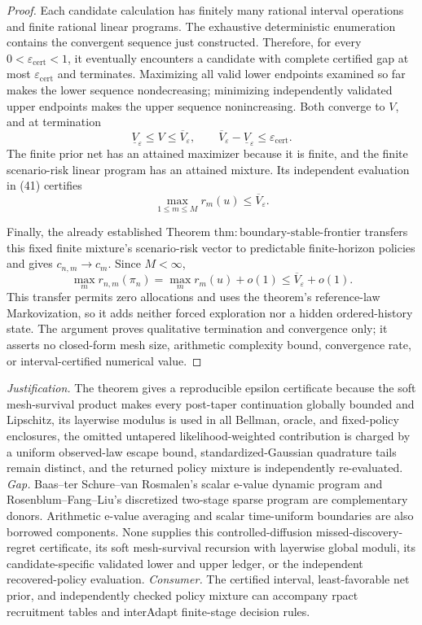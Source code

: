 \documentclass{article}
\begin{document}
\begin{proof}
Each candidate calculation has finitely many rational interval operations and finite rational linear programs.  The exhaustive deterministic enumeration contains the convergent sequence just constructed.  Therefore, for every \(0<\varepsilon_{\mathrm{cert}}<1\), it eventually encounters a candidate with complete certified gap at most \(\varepsilon_{\mathrm{cert}}\) and terminates.  Maximizing all valid lower endpoints examined so far makes the lower sequence nondecreasing; minimizing independently validated upper endpoints makes the upper sequence nonincreasing.  Both converge to \(V\), and at termination
\[
 \underline V_{\varepsilon}\leq V\leq\overline V_{\varepsilon},
 \qquad
 \overline V_{\varepsilon}-\underline V_{\varepsilon}
 \leq\varepsilon_{\mathrm{cert}}.
 \tag{42}
\]
The finite prior net has an attained maximizer because it is finite, and the finite scenario-risk linear program has an attained mixture.  Its independent evaluation in (41) certifies
\[
 \max_{1\leq m\leq M}r_m(u)\leq\overline V_{\varepsilon}.
 \tag{43}
\]

Finally, the already established Theorem \(\mathrm{thm{:}boundary\text{-}stable\text{-}frontier}\) transfers this fixed finite mixture's scenario-risk vector to predictable finite-horizon policies and gives \(c_{n,m}\to c_m\).  Since \(M<\infty\),
\[
 \max_mr_{n,m}(\pi_n)=\max_mr_m(u)+o(1)
 \leq\overline V_{\varepsilon}+o(1).
 \tag{44}
\]
This transfer permits zero allocations and uses the theorem's reference-law Markovization, so it adds neither forced exploration nor a hidden ordered-history state.  The argument proves qualitative termination and convergence only; it asserts no closed-form mesh size, arithmetic complexity bound, convergence rate, or interval-certified numerical value.
\end{proof}
\par\smallskip\noindent \textit{Justification.} The theorem gives a reproducible epsilon certificate because the soft mesh-survival product makes every post-taper continuation globally bounded and Lipschitz, its layerwise modulus is used in all Bellman, oracle, and fixed-policy enclosures, the omitted untapered likelihood-weighted contribution is charged by a uniform observed-law escape bound, standardized-Gaussian quadrature tails remain distinct, and the returned policy mixture is independently re-evaluated. \textit{Gap.} Baas--ter Schure--van Rosmalen's scalar e-value dynamic program and Rosenblum--Fang--Liu's discretized two-stage sparse program are complementary donors. Arithmetic e-value averaging and scalar time-uniform boundaries are also borrowed components. None supplies this controlled-diffusion missed-discovery-regret certificate, its soft mesh-survival recursion with layerwise global moduli, its candidate-specific validated lower and upper ledger, or the independent recovered-policy evaluation. \textit{Consumer.} The certified interval, least-favorable net prior, and independently checked policy mixture can accompany rpact recruitment tables and interAdapt finite-stage decision rules.
\end{document}
